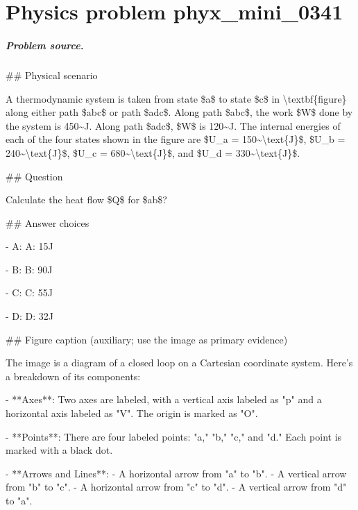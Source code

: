 
\chapter{Physics problem phyx\_mini\_0341}
\label{ch:PhyXMiniProblems_problem_phyx_mini_0341}

\paragraph{Problem source.}
\#\# Physical scenario

A thermodynamic system is taken from state \$a\$ to state \$c\$ in \textbackslash{}textbf\{figure\} along either path \$abc\$ or path \$adc\$. Along path \$abc\$, the work \$W\$ done by the system is 450\textasciitilde{}J. Along path \$adc\$, \$W\$ is 120\textasciitilde{}J. The internal energies of each of the four states shown in the figure are \$U\_a = 150\textasciitilde{}\textbackslash{}text\{J\}\$, \$U\_b = 240\textasciitilde{}\textbackslash{}text\{J\}\$, \$U\_c = 680\textasciitilde{}\textbackslash{}text\{J\}\$, and \$U\_d = 330\textasciitilde{}\textbackslash{}text\{J\}\$.

\#\# Question

Calculate the heat flow \$Q\$ for \$ab\$?

\#\# Answer choices

- A: A: 15J

- B: B: 90J

- C: C: 55J

- D: D: 32J

\#\# Figure caption (auxiliary; use the image as primary evidence)

The image is a diagram of a closed loop on a Cartesian coordinate system. Here's a breakdown of its components:

- **Axes**: Two axes are labeled, with a vertical axis labeled as "p" and a horizontal axis labeled as "V". The origin is marked as "O".

- **Points**: There are four labeled points: "a," "b," "c," and "d." Each point is marked with a black dot.

- **Arrows and Lines**: 
  - A horizontal arrow from "a" to "b".
  - A vertical arrow from "b" to "c".
  - A horizontal arrow from "c" to "d".
  - A vertical arrow from "d" to "a".
  
